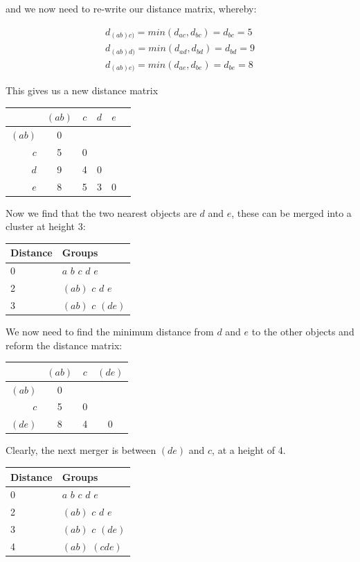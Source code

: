 and we now need to re-write our distance matrix, whereby:

\begin{eqnarray*}
d_{(ab)c)} = min(d_{ac},d_{bc}) = d_{bc} = 5\\
d_{(ab)d)} = min(d_{ad},d_{bd}) = d_{bd} = 9\\
d_{(ab)e)} = min(d_{ae},d_{be}) = d_{be} = 8
\end{eqnarray*}

This gives us a new distance matrix

\begin{minipage}[c]{0.5\textwidth}
\begin{tabular}{r|ccccc}
 & $(ab)$ & $c$ & $d$ & $e$\\
\hline
$(ab)$ & 0 &   &   &  \\
$c$    & 5 & 0 &   &  \\
$d$    & 9 & 4 & 0 &  \\
$e$    & 8 & 5 & 3 & 0\\
\end{tabular}
\end{minipage}
\begin{minipage}[c]{0.4\textwidth}

Now we find that the two nearest objects are $d$ and $e$, these can be merged into a cluster at height 3:

\begin{tabular}{ll}
Distance & Groups\\
\hline
0 & $a$ $b$ $c$ $d$ $e$\\
2 & $(ab)$ $c$ $d$ $e$\\
3 & $(ab)$ $c$ $(de)$
\end{tabular}
\end{minipage}

We now need to find the minimum distance from $d$ and $e$ to the other objects and reform the distance matrix:
\begin{minipage}[c]{0.5\textwidth}
\begin{tabular}{r|ccc}
 & $(ab)$ & $c$ & $(de)$\\
\hline
$(ab)$ & 0 &   &    \\
$c$    & 5 & 0 &   \\
$(de)$ & 8 & 4 & 0  \\
\end{tabular}
\end{minipage}
\begin{minipage}[c]{0.5\textwidth}

Clearly, the next merger is between $(de)$ and $c$, at a height of 4.

\begin{tabular}{ll}
Distance & Groups\\
\hline
0 & $a$ $b$ $c$ $d$ $e$\\
2 & $(ab)$ $c$ $d$ $e$\\
3 & $(ab)$ $c$ $(de)$\\
4 & $(ab)$ $(cde)$
\end{tabular}
\end{minipage}

